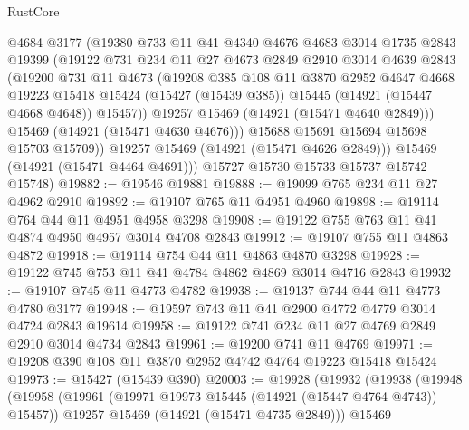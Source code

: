 \begin{lexlean}{RustCore}
\begin{coremodule}
              @4684
              @3177
              (@19380
                @733
                @11
                @41
                @4340
                @4676
                @4683
                @3014
                @1735
                @2843
                @19399
                (@19122
                  @731
                  @234
                  @11
                  @27
                  @4673
                  @2849
                  @2910
                  @3014
                  @4639
                  @2843
                  (@19200
                    @731
                    @11
                    @4673
                    (@19208
                      @385
                      @108
                      @11
                      @3870
                      @2952
                      @4647
                      @4668
                      @19223
                      @15418
                      @15424
                      (@15427 (@15439 @385))
                      @15445
                      (@14921 (@15447 @4668 @4648))
                      @15457))
                  @19257
                  @15469
                  (@14921 (@15471 @4640 @2849)))
                @15469
                (@14921 (@15471 @4630 @4676)))
              @15688
              @15691
              @15694
              @15698
              @15703
              @15709))
          @19257
          @15469
          (@14921 (@15471 @4626 @2849)))
        @15469
        (@14921 (@15471 @4464 @4691)))
      @15727
      @15730
      @15733
      @15737
      @15742
      @15748)
@19882 := @19546 @19881
@19888 := @19099 @765 @234 @11 @27 @4962 @2910
@19892 := @19107 @765 @11 @4951 @4960
@19898 := @19114 @764 @44 @11 @4951 @4958 @3298
@19908 := @19122 @755 @763 @11 @41 @4874 @4950 @4957 @3014 @4708 @2843
@19912 := @19107 @755 @11 @4863 @4872
@19918 := @19114 @754 @44 @11 @4863 @4870 @3298
@19928 := @19122 @745 @753 @11 @41 @4784 @4862 @4869 @3014 @4716 @2843
@19932 := @19107 @745 @11 @4773 @4782
@19938 := @19137 @744 @44 @11 @4773 @4780 @3177
@19948 := @19597 @743 @11 @41 @2900 @4772 @4779 @3014 @4724 @2843 @19614
@19958 := @19122 @741 @234 @11 @27 @4769 @2849 @2910 @3014 @4734 @2843
@19961 := @19200 @741 @11 @4769
@19971 := @19208 @390 @108 @11 @3870 @2952 @4742 @4764 @19223 @15418 @15424
@19973 := @15427 (@15439 @390)
@20003 := @19928
    (@19932
      (@19938
        (@19948
          (@19958
            (@19961 (@19971 @19973 @15445 (@14921 (@15447 @4764 @4743)) @15457))
            @19257
            @15469
            (@14921 (@15471 @4735 @2849)))
          @15469

\end{coremodule}
\end{lexlean}
